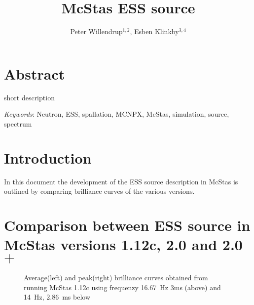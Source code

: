 \documentclass{elsarticle}
\begin{document}
\setpagewiselinenumbers
\begin{frontmatter}
\title{McStas ESS source}
\author{Peter Willendrup$^{1,2}$, Esben Klinkby$^{3,4}$}
\address{1) DTU Physics, Technical University of Denmark, DTU Lyngby Campus, Anker Engelunds Vej 1, DK-2800 Kgs. Lyngby, Denmark}
\address{2) ESS design update programme - Denmark}
\address{3) European Spallation Source ESS AB, Box 176, S-221 00 Lund, Sweden}
\address{4) DTU Nutech, Technical University of Denmark, DTU Ris\o~Campus,\\ Frederiksborgvej 399, DK-4000 Roskilde, Denmark}
\end{frontmatter}
\section{Abstract}
short description




\emph{Keywords}: Neutron, ESS, spallation, MCNPX, McStas, simulation, source, spectrum

\section{Introduction}
In this document the development of the ESS source description in McStas\cite{lefm:1999,will:2013,man,comp} is outlined by comparing brilliance curves of the various versions.

\section{Comparison between ESS source in McStas versions 1.12c, 2.0 and 2.0$+$}
\label{sec:val}

\begin{figure}[h!]
\begin{minipage}{\linewidth}
\centering
{}
\caption{Average(left) and peak(right) brilliance curves obtained from running McStas 1.12c using frequenzy 16.67~Hz 3ms (above) and 14~Hz, 2.86~ms below}
\label{fig:2001}
\end{minipage}\hfill
\end{figure}
\end{document}
